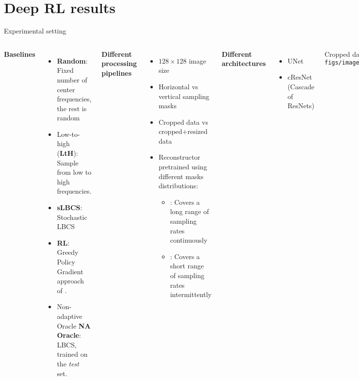\section{Deep RL results}

\begin{frame}{Experimental setting}
    \vspace{-0.7cm}    
    \begin{columns}
    
    \textbf{Baselines}
    \begin{itemize}
        \item \textbf{Random}: Fixed number of center frequencies, the rest is random
        \item Low-to-high (\textbf{LtH}): Sample from low to high frequencies.
        \item \textbf{sLBCS}: Stochastic LBCS
        \item \textbf{RL}: Greedy Policy Gradient approach of \cite{bakker2020experimental}.
        \item Non-adaptive Oracle \textbf{NA Oracle}: LBCS, trained on the \textit{test} set.
    \end{itemize}
    \vfill
    \textbf{Different processing pipelines}
    \begin{itemize}
        \item $128 \times 128$ image size
        \item Horizontal vs vertical sampling masks
        \item Cropped data vs cropped+resized data 
        \item Reconstructor pretrained using different masks distributions:
        \begin{itemize}
            \item \cite{zhang2019reducing}: Covers a long range of sampling rates continuously%
            \item \cite{bakker2020experimental}: Covers a short range of sampling rates intermittently %
        \end{itemize}
    \end{itemize}
    \vfill
    \textbf{Different architectures}
    \begin{itemize}
        \item UNet \parencite{ronneberger2015u,zbontarFastMRIOpenDataset2019}
        \item cResNet (Cascade of ResNets) \parencite{zhang2019reducing}
    \end{itemize}
    \centering 
    Cropped data
    \texttt{[image: figs/image\_cropped.pdf]}


\end{columns}
\end{frame}
